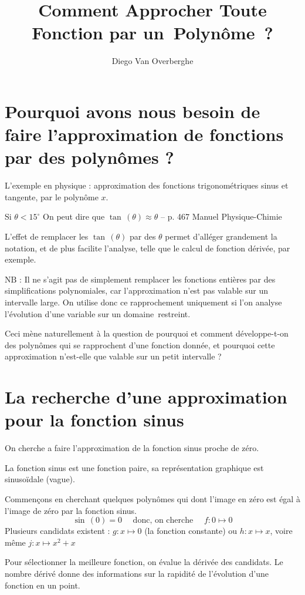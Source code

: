 \documentclass[DIV=12]{scrartcl}
\title{Comment Approcher Toute Fonction par un~Polynôme~?}
\author{Diego Van Overberghe}
\begin{document}
    \maketitle
    \section{Pourquoi avons nous besoin de faire l'approximation de fonctions par des polynômes ?}
    L'exemple en physique : approximation des fonctions trigonométriques sinus et tangente, par le polynôme $x$.
    \begin{center}
        \og Si $\theta<15^{\circ}$ On peut dire que $\tan\,(\theta)\approx\theta$ \fg{}\quad -- p. 467 Manuel Physique-Chimie
    \end{center}
    L'effet de remplacer les $\tan\,(\theta)$ par des $\theta$ permet d'alléger grandement la notation, et de plus facilite l'analyse, telle que le calcul de fonction dérivée, par exemple. 

    $\mathrm{N}\mathrm{B}$ : Il ne s'agit pas de simplement remplacer les fonctions entières par des simplifications polynomiales, car l'approximation n'est pas valable sur un intervalle large. On  utilise donc ce rapprochement uniquement si l'on analyse l'évolution d'une variable sur un domaine~restreint.

    Ceci mène naturellement à la question de pourquoi et comment développe-t-on des polynômes qui se rapprochent d'une fonction donnée, et pourquoi cette approximation n'est-elle que valable sur un petit intervalle ?

    \section{La recherche d'une approximation pour la fonction sinus}
    On cherche a faire l'approximation de la fonction sinus proche de zéro.

    La fonction sinus est une fonction paire, sa représentation graphique est sinusoïdale (vague). 
    
    Commençons en cherchant quelques polynômes qui dont l'image en zéro est égal à l'image de zéro par la fonction sinus.
    \[\sin\,(0)=0\quad\text{ donc, on cherche }\quad f:0\mapsto 0\]
    Plusieurs candidats existent : $g:x\mapsto 0$ (la fonction constante) ou $h:x\mapsto x$, voire même $j:x\mapsto x^2+x$
    
    Pour sélectionner la meilleure fonction, on évalue la dérivée des candidats. Le nombre dérivé donne des informations sur la rapidité de l'évolution d'une fonction en un point.
    
\end{document}
